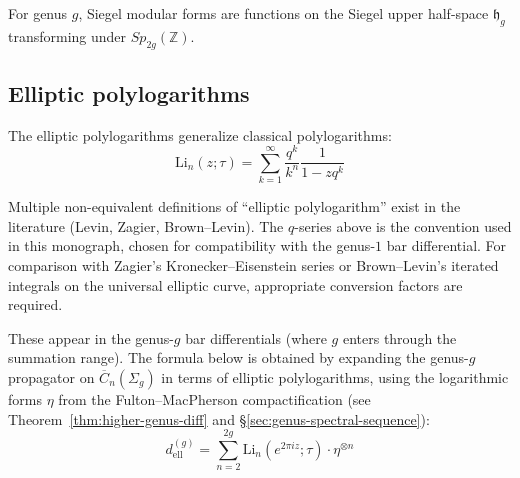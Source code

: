 For genus $g$, Siegel modular forms are functions on the Siegel upper half-space $\mathfrak{h}_g$ transforming under $Sp_{2g}(\mathbb{Z})$.

\subsection{Elliptic polylogarithms}

The elliptic polylogarithms generalize classical polylogarithms:
\[
\text{Li}_n(z;\tau) = \sum_{k=1}^\infty \frac{q^k}{k^n}\frac{1}{1-zq^k}
\]

\begin{remark}[Convention]
Multiple non-equivalent definitions of ``elliptic polylogarithm'' exist in the literature (Levin, Zagier, Brown--Levin).  The $q$-series above is the convention used in this monograph, chosen for compatibility with the genus-$1$ bar differential.  For comparison with Zagier's Kronecker--Eisenstein series or Brown--Levin's iterated integrals on the universal elliptic curve, appropriate conversion factors are required.
\end{remark}

These appear in the genus-$g$ bar differentials (where $g$ enters through the summation range).  The formula below is obtained by expanding the genus-$g$ propagator on $\overline{C}_n(\Sigma_g)$ in terms of elliptic polylogarithms, using the logarithmic forms $\eta$ from the Fulton--MacPherson compactification (see Theorem~\ref{thm:higher-genus-diff} and \S\ref{sec:genus-spectral-sequence}):
\[
d^{(g)}_{\text{ell}} = \sum_{n=2}^{2g} \text{Li}_n(e^{2\pi iz};\tau) \cdot \eta^{\otimes n}
\]
